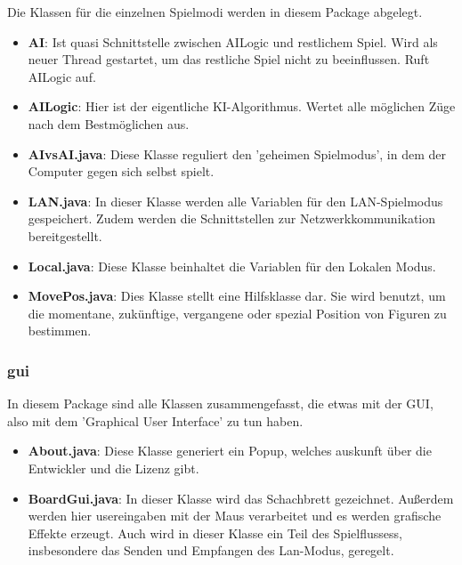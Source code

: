 \documentclass[12pt,a4paper]{article}
\newcommand{\cmnt}[1]{}			%
\begin{document}
{Die Klassen für die einzelnen Spielmodi werden in diesem Package abgelegt. 
\cmnt{TODO : AI AND AI LOGIC}

\begin{itemize}

	\item{\textbf{AI}: Ist quasi Schnittstelle zwischen AILogic und restlichem Spiel. Wird als neuer Thread gestartet, um das restliche Spiel nicht zu beeinflussen. Ruft AILogic auf.}
	
	\item{\textbf{AILogic}: Hier ist der eigentliche KI-Algorithmus. Wertet alle möglichen Züge nach dem Bestmöglichen aus.}

	\item{\textbf{AIvsAI.java}: Diese Klasse reguliert den 'geheimen Spielmodus', in dem der Computer gegen sich selbst spielt. }
	
	\item{\textbf{LAN.java}: In dieser Klasse werden alle Variablen für den LAN-Spielmodus gespeichert. Zudem werden die Schnittstellen zur Netzwerkkommunikation bereitgestellt.}
	
	\item{\textbf{Local.java}: Diese Klasse beinhaltet die Variablen für den Lokalen Modus. }

	\item{\textbf{MovePos.java}: Dies Klasse stellt eine Hilfsklasse dar. Sie wird benutzt, um die momentane, zukünftige, vergangene oder spezial Position von Figuren zu bestimmen.}

\end{itemize}

\subsubsection{gui}

In diesem Package sind alle Klassen zusammengefasst, die etwas mit der GUI, also mit dem 'Graphical User Interface' zu tun haben. 

\begin{itemize}

	\item{\textbf{About.java}: Diese Klasse generiert ein Popup, welches auskunft über die Entwickler und die Lizenz gibt. }
	
	\item{\textbf{BoardGui.java}: In dieser Klasse wird das Schachbrett gezeichnet. Außerdem werden hier usereingaben mit der Maus verarbeitet und es werden grafische Effekte erzeugt. Auch wird in dieser Klasse ein Teil des Spielflussess, insbesondere das Senden und Empfangen des Lan-Modus, geregelt. }
	

\end{itemize}}
\end{document}
